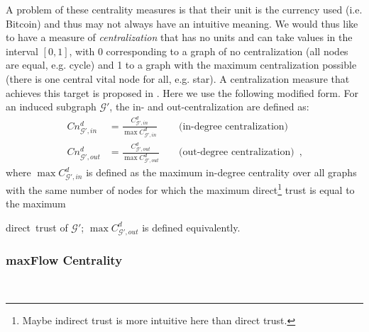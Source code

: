     A problem of these centrality measures is that their unit is the currency used (i.e. Bitcoin) and thus may not always have
    an intuitive meaning. We would thus like to have a measure of \textit{centralization} that has no units and can take
    values in the interval $\left[0,1\right]$, with 0 corresponding to a graph of no centralization (all nodes are equal,
    e.g.  cycle) and 1 to a graph with the maximum centralization possible (there is one central vital node for all, e.g.
    star). A centralization measure that achieves this target is proposed in \cite{freeman}. Here we use the following
    modified form. For an induced subgraph $\mathcal{G}'$, the in- and out-centralization are defined as:
    \begin{align*}
      Cn^d_{\mathcal{G}', in} &= \frac{C^d_{\mathcal{G}', in}}{\max C^d_{\mathcal{G}', in}} && \mbox{ (in-degree
      centralization)} \\
      Cn^d_{\mathcal{G}', out} &= \frac{C^d_{\mathcal{G}', out}}{\max C^d_{\mathcal{G}', out}} && \mbox{ (out-degree
      centralization)} \enspace,
    \end{align*}
    where $\max C^d_{\mathcal{G}', in}$ is defined as the maximum in-degree centrality over all graphs with the same number
    of nodes for which the maximum direct\footnote{Maybe indirect trust is more intuitive here than direct trust.} trust is
    equal to the maximum \addtocounter{footnote}{-1}direct\footnotemark \ trust of $\mathcal{G}'$; $\max C^d_{\mathcal{G}',
    out}$ is defined equivalently.

  \subsubsection{maxFlow Centrality} \ \\

